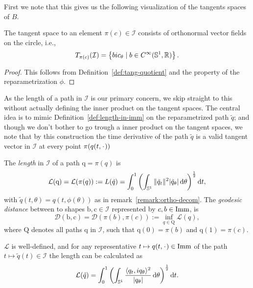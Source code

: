 First we note that this gives us the following visualization of the tangents spaces of $B$.

\begin{proposition}
  \label{prop:tangent-space-orthogonal}
The tangent space to an element $\pi(c) \in \mathcal{I}$ consists of orthonormal vector fields on the circle, i.e.,
  \begin{equation*}
    T_{\pi(c)}(\mathcal{I}) =
    \left\{
      b i c_{\theta} \mid b \in C^{\infty}(\mathbb{S}^1,\mathbb{R})
    \right\}.
  \end{equation*}
\end{proposition}

\begin{proof}
  This follows from Definition~\ref{def:tang-quotient} and the property of the reparametrization $\phi$.
\end{proof}

As the length of a path in $\mathcal{I}$ is our primary concern, we skip straight to this without actually defining the inner product on the tangent spaces. The central idea is to mimic Definition~\ref{def:length-in-imm} on the reparametrized path $\tilde{q}$; and though we don't bother to go trough a inner product on the tangent spaces, we note that by this construction the time derivative of the path $\tilde{q}$ is a valid tangent vector in $\mathcal{I}$ at every point $\pi(q(t,\blank))$

\begin{definition}
  The \textit{length} in $\mathcal{I}$ of a path $\mathrm{q}=\pi(q)$ is
  \begin{equation*}
    \mathcal{L}(\mathrm{q})= \mathcal{L}(\pi(q)) := L(\tilde{q}) =
    \int_{0}^{1}
    \left(
      \int_{\mathbb{S}^{1}} \|\tilde{q}_t\|^2 |\tilde{q}_{\theta}| \mathop{}\!\mathrm{d} \theta
    \right)^{\frac{1}{2}}
    \mathop{}\!\mathrm{d} t,
  \end{equation*}
  with $\tilde{q}(t,\theta)=q(t,\phi(\theta))$ as in remark~\ref{remark:ortho-decom}.
  The \textit{geodesic distance} between to shapes $\mathrm{b}, \mathrm{c} \in \mathcal{I}$ represented by $c,b \in \mathop{}\!\mathrm{Imm}$, is
  \begin{equation*}
    \mathcal{D}(\mathrm{b},\mathrm{c}) = \mathcal{D}(\pi(b),\pi(c)) := \inf_{q \in \mathrm{Q}} \mathcal{L}(q),
  \end{equation*}
  where $\mathrm{Q}$ denotes all paths $\mathrm{q}$ in $\mathcal{I}$, such that $\mathrm{q}(0)=\pi(b)$ and $\mathrm{q}(1)=\pi(c)$.
\end{definition}

\begin{proposition}
  \label{prop:length-quotient}
    $\mathcal{L}$ is well-defined, and for any representative $t \mapsto q(t, \blank) \in \I $ of the path $t \mapsto \tilde{q}(t) \in \mathcal{I}$ the length can be calculated as
    \begin{equation}
      \label{eq:length-quotient}
    \mathcal{L}(\tilde{q}) = \int_{0}^{1}
    \left(
      \int_{\mathbb{S}^1}  \frac{\langle q_t, i q_{\theta}\rangle^2}{|q_{\theta}|} \mathop{}\!\mathrm{d} \theta
    \right)^{\frac{1}{2}} \mathop{}\!\mathrm{d} t.
  \end{equation}
\end{proposition}

